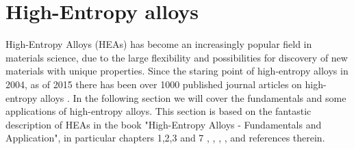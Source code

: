 \chapter{High-Entropy alloys}
\label{sec:HEA}

High-Entropy Alloys (HEAs) has become an increasingly popular field in materials science, due to the large flexibility and possibilities for discovery of new materials with unique properties. Since the staring point of high-entropy alloys in 2004, as of 2015 there has been over 1000 published journal articles on high-entropy alloys \cite{hea2016_ch1}. In the following section we will cover the fundamentals and some applications of high-entropy alloys. This section is based on the fantastic description of HEAs in the book "High-Entropy Alloys - Fundamentals and Application", in particular chapters 1,2,3 and 7 \cite{hea2016_ch1}, \cite{hea2016_ch2}, \cite{hea2016_ch3}, \cite{hea2016_ch7}, and references therein.

